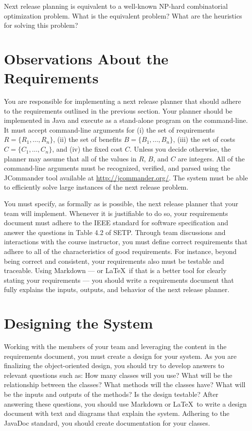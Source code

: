 Next release planning is equivalent to a well-known NP-hard combinatorial optimization problem.  What is the
equivalent problem? What are the heuristics for solving this problem?

\section*{Observations About the Requirements}

You are responsible for implementing a next release planner that should adhere to the requirements outlined in the
previous section.  Your planner should be implemented in Java and execute as a stand-alone program on the command-line.
It must accept command-line arguments for (i) the set of requirements $R = \{ R_1, \ldots, R_n \}$, (ii) the set of
benefits $B = \{ B_1, \ldots, B_n \}$, (iii) the set of costs $C = \{ C_1, \ldots, C_n \}$, and (iv) the
fixed cost $C$. Unless you decide otherwise, the planner may assume that all of the values in $R$, $B$, and $C$ are
integers. All of the command-line arguments must be recognized, verified, and parsed using the JCommander tool available
at \url{http://jcommander.org/}. The system must be able to efficiently solve large instances of the next release problem.

You must specify, as formally as is possible, the next release planner that your team will implement.  Whenever it is
justifiable to do so, your requirements document must adhere to the IEEE standard for software specification and answer
the questions in Table 4.2 of SETP.  Through team discussions and interactions with the course instructor, you must
define correct requirements that adhere to all of the characteristics of good requirements.  For instance, beyond being
correct and consistent, your requirements also must be testable and traceable.  Using Markdown --- or \LaTeX\ if that is
a better tool for clearly stating your requirements --- you should write a requirements document that fully explains the
inputs, outputs, and behavior of the next release planner.

\section*{Designing the System}

Working with the members of your team and leveraging the content in the requirements document, you must create a design
for your system.  As you are finalizing the object-oriented design, you should try to develop answers to relevant
questions such as: How many classes will you use? What will be the relationship between the classes? What methods will
the classes have? What will be the inputs and outputs of the methods?  Is the design testable?  After answering these
questions, you should use Markdown or \LaTeX\ to write a design document with text and diagrams that explain the system.
Adhering to the JavaDoc standard, you should create documentation for your classes.

